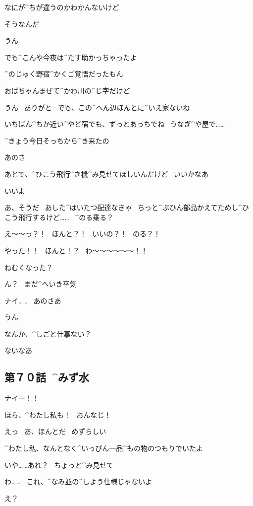 \Nai なにが^{ちが}{違}うのかわかんないけど

\Alpha そうなんだ

\Nai うん

\page
\Alpha でも^{こんや}{今夜}は^{たす}{助}かっちゃったよ

\Alpha ^{のじゅく}{野宿}^{かくご}{覚悟}だったもん

\Nai おばちゃんまぜて^{かわ}{川}の^{じ}{字}だけど

\Alpha うん
\ ありがと
\ でも、この^{へん}{辺}ほんとに^{いえ}{家}ないね

\Nai いちばん^{ちか}{近}い^{やど}{宿}でも、ずっとあっちでね
\ うなぎ^{や}{屋}で……

\Alpha ^{きょう}{今日}そっちから^{き}{来}たの

\page
\Alpha あのさ

\Alpha あとで、^{ひこう}{飛行}^{き}{機}^{み}{見}せてほしいんだけど
\ いいかなあ

\Nai いいよ

\Nai あ、そうだ
\ あした^{はいたつ}{配達}なきゃ
\ ちっと^{ぶひん}{部品}かえてためし^{ひこう}{飛行}するけど……
\ ^{のる}{乗る}？

\Alpha え〜〜っ？！
\ ほんと？！
\ いいの？！
\ のる？！

\Alpha やった！！
\ ほんと！？
\ わ〜〜〜〜〜〜！！

\page[57]
\Nai ねむくなった？

\Alpha ん？
\ まだ^{へいき}{平気}

\Alpha ナイ……
\ あのさあ

\Nai うん

\page
\Alpha なんか、^{しごと}{仕事}ない？

\Nai ないなあ


\subsection{第７０話\ ^{みず}{水}}

\page[61]
\Alpha ナイー！！

\page
\Alpha ほら、^{わたし}{私}も！
\ おんなじ！

\Nai えっ
\ あ、ほんとだ
\ めずらしい

\Alpha ^{わたし}{私}、なんとなく^{いっぴん}{一品}^{もの}{物}のつもりでいたよ

\Nai いや……あれ？
\ ちょっと^{み}{見}せて

\Nai わ……
\ これ、^{なみ}{並}の^{しよう}{仕様}じゃないよ

\Alpha え？

